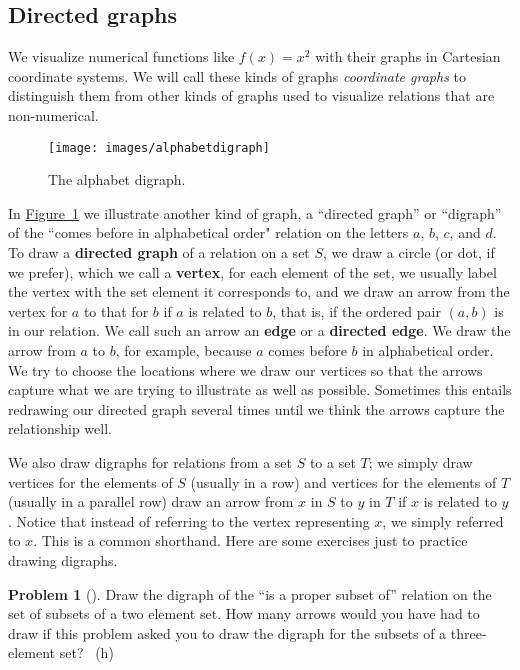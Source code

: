 \documentclass[10pt,]{book}
\newcommand{\terminology}[1]{\textbf{#1}}
\theoremstyle{plain}
\theoremstyle{definition}
\newtheorem{activity}[project]{Problem}
\theoremstyle{definition}
\numberwithin{equation}{chapter}
\begin{document}
\subsection[{Directed graphs}]{Directed graphs}\label{relationdigraph}
\hypertarget{p-1870}{}%
We visualize numerical functions like \(f(x)=x^2\) with their graphs in Cartesian coordinate systems. We will call these kinds of graphs \emph{coordinate graphs} to distinguish them from other kinds of graphs used to visualize relations that are non-numerical.%
\begin{figure}
\centering
\texttt{[image: images/alphabetdigraph]}
\caption{The alphabet digraph.\label{alphabetdigraph}}
\end{figure}
\hypertarget{p-1871}{}%
In \hyperref[alphabetdigraph]{Figure~\ref{alphabetdigraph}} we illustrate another kind of graph, a ``directed graph'' or ``digraph'' of the ``comes before in alphabetical order" relation on the letters \(a\), \(b\), \(c\), and \(d\). To draw a \terminology{directed graph} of a relation on a set \(S\), we draw a circle (or dot, if we prefer), which we call a \terminology{vertex}, for each element of the set, we usually label the vertex with the set element it corresponds to, and we draw an arrow from the vertex for \(a\) to that for \(b\) if \(a\) is related to \(b\), that is, if the ordered pair \((a,b)\) is in our relation. We call such an arrow an \terminology{edge} or a \terminology{directed edge}. We draw the arrow from \(a\) to \(b\), for example, because \(a\) comes before \(b\) in alphabetical order. We try to choose the locations where we draw our vertices so that the arrows capture what we are trying to illustrate as well as possible. Sometimes this entails redrawing our directed graph several times until we think the arrows capture the relationship well.%
\par
\hypertarget{p-1872}{}%
We also draw digraphs for relations from a set \(S\) to a set \(T\); we simply draw vertices for the elements of \(S\) (usually in a row) and vertices for the elements of \(T\) (usually in a parallel row) draw an arrow from \(x\) in \(S\) to \(y\) in \(T\) if \(x\) is related to \(y\). Notice that instead of referring to the vertex representing \(x\), we simply referred to \(x\). This is a common shorthand. Here are some exercises just to practice drawing digraphs.%
\begin{activity}[]\marginsymbol[-1em]{} \label{activity-332}
\hypertarget{p-1873}{}%
Draw the digraph of the ``is a proper subset of'' relation on the set of subsets of a two element set. How many arrows would you have had to draw if this problem asked you to draw the digraph for the subsets of a three-element set?%
~{\tiny (h)}\end{activity}
\end{document}
